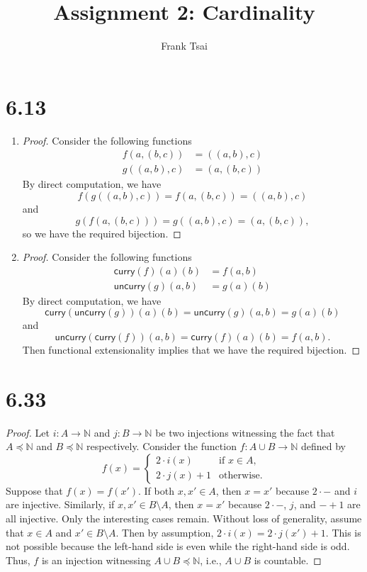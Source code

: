 \documentclass[a4paper]{article}
\title{Assignment 2: Cardinality}
\author{Frank Tsai}
\newcommand{\curry}{\mathsf{curry}}
\newcommand{\uncurry}{\mathsf{uncurry}}
\newcommand{\N}{\mathbb{N}}
\newcommand{\To}[3]{#1\colon#2\to#3}
\begin{document}
\maketitle

\section*{6.13}
\begin{enumerate}
\item
  \begin{proof}
    Consider the following functions
    \begin{align*}
      f(a,(b,c)) &= ((a,b),c)\\
      g((a,b),c) &= (a,(b,c))
    \end{align*}
    By direct computation, we have \[f(g((a,b),c)) = f(a,(b,c)) = ((a,b),c)\] and \[g(f(a,(b,c))) = g((a,b),c) = (a,(b,c)),\] so we have the required bijection.
  \end{proof}
\item
  \begin{proof}
    Consider the following functions
    \begin{align*}
      \curry(f)(a)(b) &= f(a,b)\\
      \uncurry(g)(a,b) &= g(a)(b)
    \end{align*}
    By direct computation, we have \[\curry(\uncurry(g))(a)(b) = \uncurry(g)(a,b) = g(a)(b)\] and \[\uncurry(\curry(f))(a,b) = \curry(f)(a)(b) = f(a,b).\]
    Then functional extensionality implies that we have the required bijection.
  \end{proof}
\end{enumerate}

\section*{6.33}
\begin{proof}
  Let $\To{i}{A}{\N}$ and $\To{j}{B}{\N}$ be two injections witnessing the fact that $A \preceq \N$ and $B \preceq \N$ respectively.
  Consider the function $\To{f}{A \cup B}{\N}$ defined by \[
    f(x) =
    \begin{cases}
      2 \cdot i(x) & \text{if $x \in A$,}\\
      2 \cdot j(x) + 1 & \text{otherwise.}
    \end{cases}
  \]
  Suppose that $f(x) = f(x')$.
  If both $x, x' \in A$, then $x = x'$ because $2 \cdot -$ and $i$ are injective.
  Similarly, if $x, x' \in B \setminus A$, then $x = x'$ because $2 \cdot -$, $j$, and $- + 1$ are all injective.
  Only the interesting cases remain.
  Without loss of generality, assume that $x \in A$ and $x' \in B \setminus A$.
  Then by assumption, $2 \cdot i(x) = 2 \cdot j(x') + 1$.
  This is not possible because the left-hand side is even while the right-hand side is odd.
  Thus, $f$ is an injection witnessing $A \cup B \preceq \N$, i.e., $A \cup B$ is countable.
\end{proof}
\end{document}
